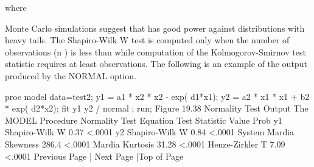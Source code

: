  				 	 
where
 		 	 
 		 	 
Monte Carlo simulations suggest that  has good power against distributions with heavy tails.
The Shapiro-Wilk W test is computed only when the number of observations (n ) is less than  while computation of the Kolmogorov-Smirnov test statistic requires at least  observations.
The following is an example of the output produced by the NORMAL option.

proc model data=test2;
   y1 = a1 * x2 * x2 - exp( d1*x1);
   y2 = a2 * x1 * x1 + b2 * exp( d2*x2);
   fit y1 y2 / normal ;
run;
Figure 19.38 Normality Test Output
The MODEL Procedure
Normality Test
Equation	Test Statistic	Value	Prob
y1	Shapiro-Wilk W	0.37	<.0001
y2	Shapiro-Wilk W	0.84	<.0001
System	Mardia Skewness	286.4	<.0001
 	Mardia Kurtosis	31.28	<.0001
 	Henze-Zirkler T	7.09	<.0001
Previous Page | Next Page |Top of Page
